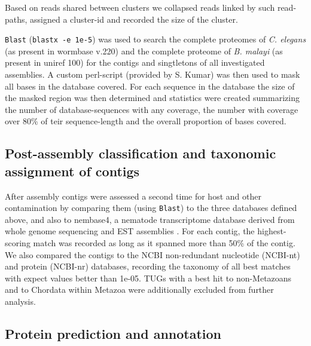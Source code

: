 Based on reads shared between clusters we collapsed reads linked by
such read-paths, assigned a cluster-id and recorded the size of the
cluster.

\texttt{Blast} (\texttt{blastx -e 1e-5}) was used to search the
complete proteomes of \textit{C. elegans} (as present in wormbase
v.220) and the complete proteome of \textit{B. malayi} (as present in
uniref 100) for the contigs and singtletons of all investigated
assemblies. A custom perl-script (provided by S. Kumar) was then used
to mask all bases in the database covered. For each sequence in the
database the size of the masked region was then determined and
statistics were created summarizing the number of database-sequences
with any coverage, the number with coverage over 80\% of teir
sequence-length and the overall proportion of bases covered.

\subsection*{Post-assembly classification and taxonomic assignment of
  contigs}

After assembly contigs were assessed a second time for host and other
contamination by comparing them (using \texttt{Blast}) to the three
databases defined above, and also to nembase4, a nematode
transcriptome database derived from whole genome sequencing and EST
assemblies \cite{parkinson_nembase:resource_2004, pmid21550347}. For
each contig, the highest-scoring match was recorded as long as it
spanned more than 50\% of the contig. We also compared the contigs to
the NCBI non-redundant nucleotide (NCBI-nt) and protein (NCBI-nr)
databases, recording the taxonomy of all best matches with expect
values better than 1e-05. TUGs with a best hit to non-Metazoans and to
Chordata within Metazoa were additionally excluded from further
analysis.

\subsection*{Protein prediction and annotation}

